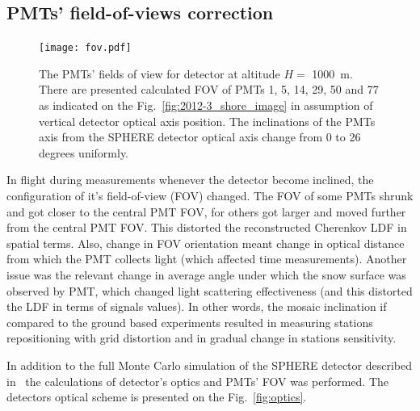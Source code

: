 \documentclass[final,5p,times,twocolumn]{elsarticle}
\begin{document}


\subsection{PMTs' field-of-views correction}

\begin{figure}[bth]
\centering
    \texttt{[image: fov.pdf]}
    \caption{The PMTs' fields of view for detector at altitude $H=$ 1000~m. There are presented calculated FOV of PMTs 1, 5, 14, 29, 50 and 77 as indicated on the Fig.~\ref{fig:2012-3_shore_image} in assumption of vertical detector optical axis position. The inclinations of the PMTs axis from the SPHERE detector optical axis change from 0 to 26 degrees uniformly.}
\label{fig:pmt_fov}
\end{figure}

In flight during measurements whenever the detector become inclined, the configuration of it's field-of-view (FOV) changed. The FOV of some PMTs shrunk and got closer to the central PMT FOV, for others got larger and moved further from the central PMT FOV. This distorted the reconstructed Cherenkov LDF in spatial terms. Also, change in FOV orientation meant change in optical distance from which the PMT collects light (which affected time measurements). Another issue was the relevant change in average angle under which the snow surface was observed by PMT, which changed light scattering effectiveness (and this distorted the LDF in terms of signals values). In other words, the mosaic inclination if compared to the ground based experiments resulted in measuring stations repositioning with grid distortion and in gradual change in stations sensitivity.

In addition to the full Monte Carlo simulation of the SPHERE detector described in~\cite{Ant19} the calculations of detector's optics and PMTs' FOV was performed. The detectors optical scheme is presented on the Fig.~\ref{fig:optics}. 
\end{document}
